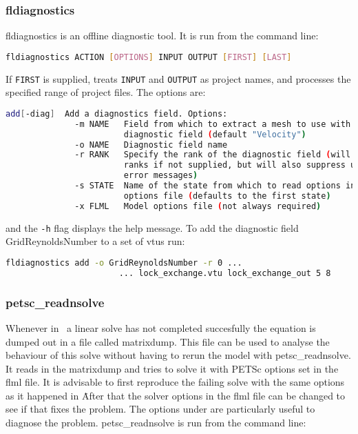 
\subsubsection{fldiagnostics}
\label{sect:fldiagnostics}
fldiagnostics is an offline diagnostic tool. It is run from the command line:

\begin{lstlisting}[language = Bash]
fldiagnostics ACTION [OPTIONS] INPUT OUTPUT [FIRST] [LAST]
\end{lstlisting}

If \lstinline[language = Bash]+FIRST+ is supplied, treats \lstinline[language = Bash]+INPUT+ and \lstinline[language = Bash]+OUTPUT+ as project names, and processes the specified range of project files. The options are:
\begin{lstlisting}[language = Bash]
add[-diag]  Add a diagnostics field. Options:
              -m NAME   Field from which to extract a mesh to use with the
                        diagnostic field (default "Velocity")
              -o NAME   Diagnostic field name
              -r RANK   Specify the rank of the diagnostic field (will try all
                        ranks if not supplied, but will also suppress useful
                        error messages)
              -s STATE  Name of the state from which to read options in the 
                        options file (defaults to the first state)
              -x FLML   Model options file (not always required)
\end{lstlisting}

and the \lstinline[language = Bash]+-h+ flag displays the help message. To add the diagnostic field GridReynoldsNumber to a set of vtus run:

\begin{lstlisting}[language = Bash]
fldiagnostics add -o GridReynoldsNumber -r 0 ...
			           ... lock_exchange.vtu lock_exchange_out 5 8
\end{lstlisting}



\subsubsection{petsc\_readnsolve}
\label{sect:petsc_readnsolve} 
Whenever in \fluidity\ a linear solve has not completed succesfully the equation is dumped out in a file called matrixdump. This file can be used to analyse the behaviour of this solve without having to rerun the model with petsc\_readnsolve. It reads in the matrixdump and tries to solve it with PETSc options set in the flml file. It is advisable to first reproduce the failing solve with the same options as it happened in \fluidity\. After that the solver options in the flml file can be changed to see if that fixes the problem. The options under  are particularly useful to diagnose the problem.  petsc\_readnsolve is run from the command line:

